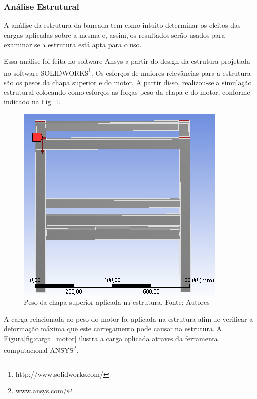 \subsubsection*{\textbf{Análise Estrutural}}

    A análise da estrutura da bancada tem como intuito determinar os efeitos das cargas aplicadas sobre a mesma e, assim, os resultados serão usados para examinar se a estrutura está apta para o uso.

    Essa análise foi feita no software Ansys a partir do design da estrutura projetada no software SOLIDWORKS\footnote{http://www.solidworks.com/}. Os esforços de maiores relevâncias para a estrutura são os pesos da chapa superior e do motor. A partir disso, realizou-se a simulação estrutural colocando como esforços as forças peso da chapa e do motor, conforme indicado na Fig. \ref{fig:an_estrutural}.

  \begin{figure}[H]
      \centering
      \includegraphics[scale=0.7]{figuras/an_estrutural.png}
      \caption{Peso da chapa superior aplicada na estrutura. Fonte: Autores}
      \label{fig:an_estrutural}
      \end{figure}

    A carga relacionada ao peso do motor foi aplicada na estrutura afim de verificar a deformação máxima que este carregamento pode causar na estrutura. A  Figura\ref{fig:carga_motor} ilustra a carga aplicada atraves da ferramenta computacional ANSYS\footnote{www.ansys.com/}.

